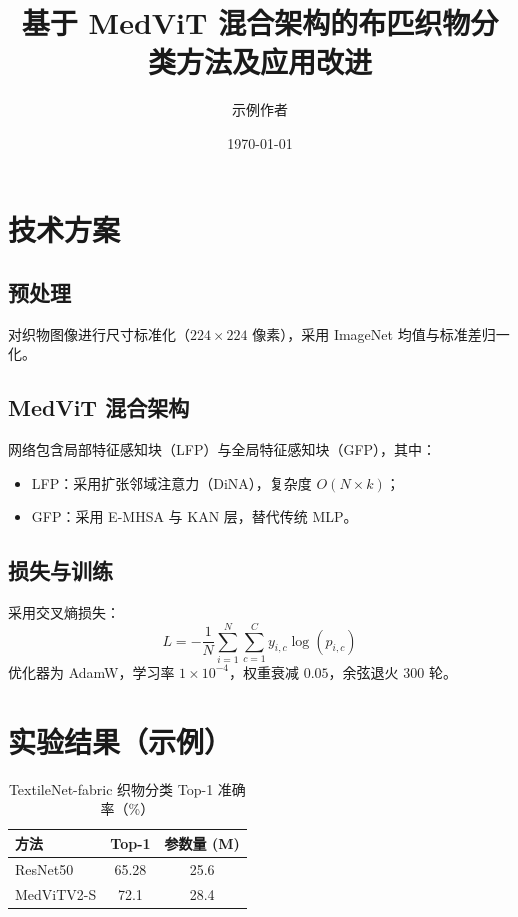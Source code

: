 \documentclass[UTF8]{ctexart}
\title{基于 MedViT 混合架构的布匹织物分类方法及应用改进}
\author{示例作者}
\date{\today}
\begin{document}
\maketitle

\section{技术方案}

\subsection{预处理}
对织物图像进行尺寸标准化（$224\times 224$ 像素），采用 ImageNet 均值与标准差归一化。

\subsection{MedViT 混合架构}
网络包含局部特征感知块（LFP）与全局特征感知块（GFP），其中：
\begin{itemize}
  \item LFP：采用扩张邻域注意力（DiNA），复杂度 $O(N\times k)$；
  \item GFP：采用 E-MHSA 与 KAN 层，替代传统 MLP。
\end{itemize}

\subsection{损失与训练}
采用交叉熵损失：
\[
  L = -\frac{1}{N}\sum_{i=1}^{N}\sum_{c=1}^{C} y_{i,c}\log(p_{i,c})
\]
优化器为 AdamW，学习率 $1\times 10^{-4}$，权重衰减 $0.05$，余弦退火 300 轮。

\section{实验结果（示例）}

\begin{table}[htbp]
  \centering
  \caption{TextileNet-fabric 织物分类 Top-1 准确率（\%）}
  \begin{tabular}{lcc}
    \toprule
    方法        & Top-1 & 参数量 (M) \\
    \midrule
    ResNet50    & 65.28 & 25.6       \\
    MedViTV2-S  & 72.1  & 28.4       \\
    \bottomrule
  \end{tabular}
\end{table}
\end{document}
